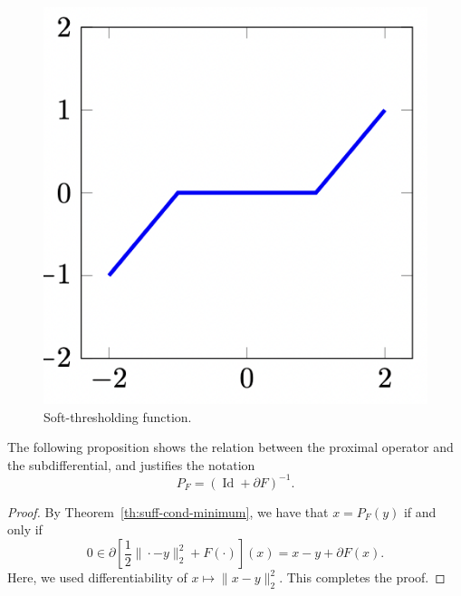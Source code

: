 \documentclass{report}
\begin{document}

\begin{figure}
	\centering
	\includegraphics[width=.3\textwidth]{images/soft-thresholding.png}
	\caption{Soft-thresholding function.}
	\label{fig:soft-thresholding}
\end{figure}


The following proposition shows the relation between the proximal operator and the subdifferential, and justifies the notation 
\begin{equation}
	P_F = (\operatorname{Id} + \partial F)^{-1}.
\end{equation}


\begin{proof}
	By Theorem~\ref{th:suff-cond-minimum}, we have that $x=P_F(y)$ if and only if 
	\begin{equation}
		0 \in \partial\left[ \frac12 \|\cdot-y\|_2^2 + F(\cdot)\right](x) = x - y +\partial F(x).
	\end{equation}
	Here, we used differentiability of $x\mapsto \|x-y\|_2^2$. This completes the proof.
\end{proof}
\end{document}
